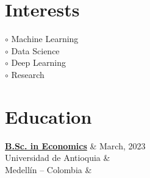 \documentclass[a3paper,11pt]{article}
\begin{document}
\begin{adjustbox}{valign=t}
\begin{minipage}{0.3\textwidth}
\section*{Interests}
\raggedright
\textcolor{ColorOne}{$\circ$} Machine Learning\\
\textcolor{ColorOne}{$\circ$} Data Science\\
\textcolor{ColorOne}{$\circ$} Deep Learning\\
\textcolor{ColorOne}{$\circ$} Research

\vfill

\section*{Education}
\begin{tblr}{}
	{\hypersetup{urlcolor=black}\href{https://github.com/AlRamirezRe/Resume-Documents/blob/master/ACTA-HV1152210514.pdf}{\textbf{B.Sc. in
Economics}}} & \normalfont \textcolor{ColorOne}{March, 2023} \\
	 Universidad de Antioquia &  \\
         Medellín -- Colombia	&  \\
\end{tblr}


\vfill
\end{minipage}
\end{adjustbox}
\end{document}
